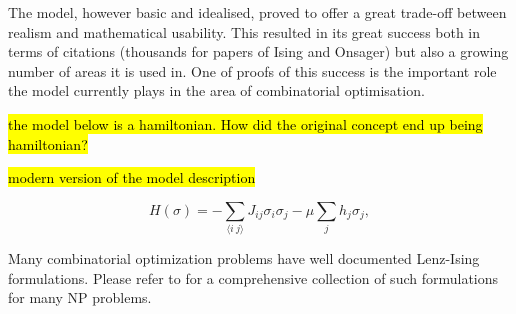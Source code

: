 The model, however basic and idealised, proved to offer a great trade-off between realism and mathematical usability. This resulted in its great success both in terms of citations (thousands for papers of Ising and Onsager) but also a growing number of areas it is used in. One of proofs of this success is the important role the model currently plays in the area of combinatorial optimisation.

\hl{the model below is a hamiltonian. How did the original concept end up being hamiltonian?}

\hl{modern version of the model description}

\[H(\sigma) = -\sum_{\langle i~j\rangle} J_{ij} \sigma_i \sigma_j - \mu \sum_j h_j \sigma_j,\]

Many combinatorial optimization problems have well documented Lenz-Ising formulations. Please refer to \cite{lucas_ising_2014} for a comprehensive collection of such formulations for many NP problems.